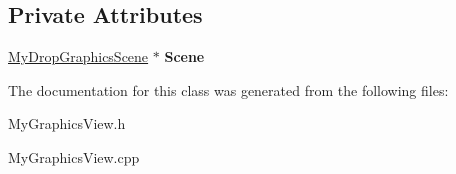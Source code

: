 \subsection*{Private Attributes}
\begin{DoxyCompactItemize}
\item 
\hypertarget{class_my_graphics_view_a96bd1f2147b155a6efb1e407e5784200}{}\hyperlink{class_my_drop_graphics_scene}{My\+Drop\+Graphics\+Scene} $\ast$ {\bfseries Scene}\label{class_my_graphics_view_a96bd1f2147b155a6efb1e407e5784200}

\end{DoxyCompactItemize}


The documentation for this class was generated from the following files\+:\begin{DoxyCompactItemize}
\item 
My\+Graphics\+View.\+h\item 
My\+Graphics\+View.\+cpp\end{DoxyCompactItemize}
